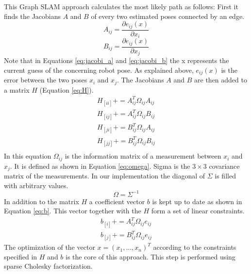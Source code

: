\documentclass{ba-kecs}
\begin{document}
This Graph SLAM approach calculates the most likely path as follows:
First it finds the Jacobians \(A\) and \(B\) of every two estimated poses connected by an edge.
\begin{equation}
\label{eq:jacobi_a}
	A_{ij} = \frac{\partial e_{ij}(x)}{\partial x_i}
\end{equation}
\begin{equation}
\label{eq:jacobi_b}
	B_{ij} = \frac{\partial e_{ij}(x)}{\partial x_j}
\end{equation}
Note that in Equations \ref{eq:jacobi_a} and \ref{eq:jacobi_b} the x represents the current guess of the concerning robot pose. As explained above, \(e_{ij}(x)\) is the error between the two poses \(x_i\) and \(x_j\). The Jacobians \(A\) and \(B\) are then added to a matrix \(H\) (Equation \ref{eq:H}).
\begin{equation}
\label{eq:H}
\begin{aligned}
	H_{[ii]} += A^{T}_{ij} \Omega_{ij} A_{ij} \\
	H_{[ij]} += A^{T}_{ij} \Omega_{ij} B_{ij} \\
	H_{[ji]} += B^{T}_{ij} \Omega_{ij} A_{ij} \\
	H_{[jj]} += B^{T}_{ij} \Omega_{ij} B_{ij} \\
\end{aligned}
\end{equation}
In this equation $\Omega_{ij}$ is the information matrix of a measurement between \(x_i\) and \(x_j\). It is defined as shown in Equation \ref{eq:omega}.
Sigma is the $3 \times 3$ covariance matrix of the measurements. In our implementation the diagonal of $\Sigma$ is filled with arbitrary values.
\begin{equation}
\label{eq:omega}
\Omega = \Sigma^{-1}
\end{equation}
In addition to the matrix $H$ a coefficient vector \(b\) is kept up to date as shown in Equation \ref{eq:b}. This vector together with the \(H\) form a set of linear constraints.
\begin{equation}
\label{eq:b}
\begin{aligned}
	b_{[i]} += A^{T}_{ij} \Omega_{ij} e_{ij} \\
	b_{[j]} += B^{T}_{ij} \Omega_{ij} e_{ij} 
\end{aligned}
\end{equation}
The optimization of the vector \(x = (x_1, ..., x_n)^T \) according to the constraints specified in \(H\) and \(b\) is the core of this approach. This step is performed using sparse Cholesky factorization. 
\end{document}
